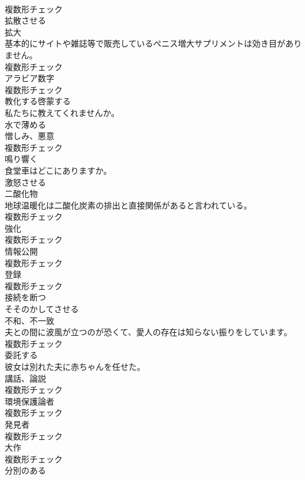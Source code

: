 \documentclass[8pt]{extreport}
\begin{document}
\begin{CJK}{UTF8}{min}
\\	複数形チェック
\\	[動詞]	拡散させる	
\\	[名詞]	拡大	
\\	基本的にサイトや雑誌等で販売しているペニス増大サプリメントは効き目がありません。	
\\	複数形チェック
\\	[名詞]	アラビア数字	
\\	複数形チェック
\\	[動詞]	教化する啓蒙する	
\\	私たちに教えてくれませんか。	
\\	[動詞]	水で薄める	
\\	[名詞]	憎しみ、悪意	
\\	複数形チェック
\\	[動詞]	鳴り響く	
\\	食堂車はどこにありますか。	
\\	[動詞]	激怒させる	
\\	[名詞]	二酸化物	
\\	地球温暖化は二酸化炭素の排出と直接関係があると言われている。	
\\	複数形チェック
\\	[名詞]	強化	
\\	複数形チェック
\\	[名詞]	情報公開	
\\	複数形チェック
\\	[名詞]	登録	
\\	複数形チェック
\\	[動詞]	接続を断つ	
\\	[動詞]	そそのかしてさせる	
\\	[名詞]	不和、不一致	
\\	夫との間に波風が立つのが恐くて、愛人の存在は知らない振りをしています。	
\\	複数形チェック
\\	[動詞]	委託する	
\\	彼女は別れた夫に赤ちゃんを任せた。	
\\	[名詞]	講話、論説	
\\	複数形チェック
\\	[名詞]	環境保護論者	
\\	複数形チェック
\\	[名詞]	発見者	
\\	複数形チェック
\\	[名詞]	大作	
\\	複数形チェック
\\	[形容詞]	分別のある	

\end{CJK}
\end{document}
